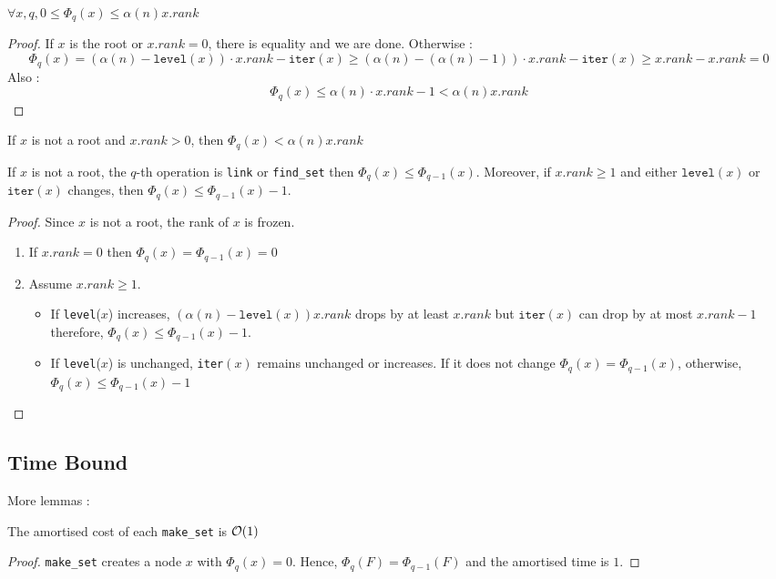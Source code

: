 \documentclass{cours}
\begin{document}
\begin{lemma}
    $\forall x, q, 0 \leq \Phi_{q}(x) \leq \alpha(n)x.rank$
\end{lemma}
\begin{proof}
    If $x$ is the root or $x.rank = 0$, there is equality and we are done. Otherwise : 
    \[
        \Phi_{q}(x) = \left(\alpha(n) - \texttt{level}(x)\right) \cdot x.rank - \texttt{iter}(x) \geq \left(\alpha(n) - (\alpha(n) - 1)\right) \cdot x.rank - \texttt{iter}(x) \geq x.rank - x.rank = 0
    \]
    Also : 
    \[
        \Phi_{q}(x) \leq \alpha(n)\cdot x.rank - 1 < \alpha(n) x.rank
    \]
\end{proof}
\begin{corollary}\label{cor9}
    If $x$ is not a root and $x.rank > 0$, then $\Phi_{q}(x) < \alpha(n)x.rank$
\end{corollary}

\begin{lemma}\label{lemma10}
    If $x$ is not a root, the $q$-th operation is \texttt{link} or \texttt{find\_set} then $\Phi_{q}(x) \leq \Phi_{q - 1}(x)$. Moreover, if $x.rank \geq 1$ and either $\texttt{level}(x)$ or $\texttt{iter}(x)$ changes, then $\Phi_{q}(x) \leq \Phi_{q - 1}(x) - 1$.
\end{lemma}
\begin{proof}
    Since $x$ is not a root, the rank of $x$ is frozen.
    \begin{enumerate}
        \item If $x.rank = 0$ then $\Phi_{q}(x) = \Phi_{q - 1}(x) = 0$
        \item Assume $x.rank \geq 1$.
        \begin{itemize}
            \item If \texttt{level}($x$) increases, $\left(\alpha(n) - \texttt{level}(x)\right)x.rank$ drops by at least $x.rank$ but $\texttt{iter}(x)$ can drop by at most $x.rank - 1$ therefore, $\Phi_{q}(x) \leq \Phi_{q - 1}(x) - 1$.
            \item If \texttt{level}($x$) is unchanged, \texttt{iter}$(x)$ remains unchanged or increases. If it does not change $\Phi_{q}(x) = \Phi_{q - 1}(x)$, otherwise, $\Phi_{q}(x) \leq \Phi_{q - 1}(x) - 1$
        \end{itemize}
    \end{enumerate}
\end{proof}

\subsection{Time Bound}
More lemmas : 
\begin{lemma}
    The amortised cost of each \texttt{make\_set} is $\mathcal{O}(1)$
\end{lemma}
\begin{proof}
    \texttt{make\_set} creates a node $x$ with $\Phi_{q}(x) = 0$. Hence, $\Phi_{q}(F) = \Phi_{q - 1}(F)$ and the amortised time is $1$.
\end{proof}
\end{document}
